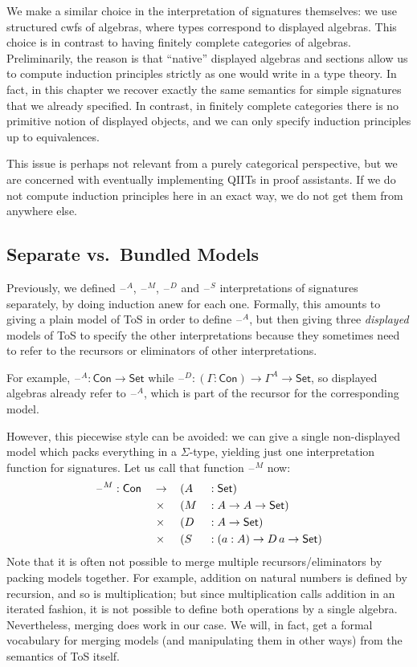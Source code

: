 \documentclass[12pt,a4paper,twoside,openany]{book}
\theoremstyle{remark}
\theoremstyle{definition}
\theoremstyle{theorem}
\newcommand{\Con}{\mathsf{Con}}
\newcommand{\blank}{\mathord{\hspace{1pt}\text{--}\hspace{1pt}}}
\newcommand{\Set}{\mathsf{Set}}
\begin{document}
We make a similar choice in the interpretation of signatures themselves: we use
structured cwfs of algebras, where types correspond to displayed algebras. This
choice is in contrast to having finitely complete categories of algebras.
Preliminarily, the reason is that ``native'' displayed algebras and sections
allow us to compute induction principles strictly as one would write in a type
theory. In fact, in this chapter we recover exactly the same semantics for
simple signatures that we already specified. In contrast, in finitely complete
categories there is no primitive notion of displayed objects, and we can only
specify induction principles up to equivalences.

This issue is perhaps not relevant from a purely categorical perspective, but we
are concerned with eventually implementing QIITs in proof assistants. If we do
not compute induction principles here in an exact way, we do not get them from
anywhere else.

\subsection{Separate vs.\ Bundled Models}

Previously, we defined $\blank^A$, $\blank^M$, $\blank^D$ and $\blank^S$
interpretations of signatures separately, by doing induction anew for each
one. Formally, this amounts to giving a plain model of ToS in order to define
$\blank^A$, but then giving three \emph{displayed} models of ToS to specify the
other interpretations because they sometimes need to refer to the recursors or
eliminators of other interpretations.

For example, $\blank^A : \Con \to \Set$ while $\blank^D : (\Gamma : \Con) \to
\Gamma^A \to \Set$, so displayed algebras already refer to $\blank^A$, which is
part of the recursor for the corresponding model.

However, this piecewise style can be avoided: we can give a single non-displayed
model which packs everything in a $\Sigma$-type, yielding just one
interpretation function for signatures. Let us call that function $\blank^M$ now:
\begin{alignat*}{5}
  & \blank^M : \Con &&\to \,&&(A &&: \Set)\\
  & &&\hspace{0.3em}\times &&(M  &&: A \to A \to \Set)\\
  & &&\hspace{0.3em}\times &&(D  &&: A \to \Set)\\
  & &&\hspace{0.3em}\times &&(S  &&: (a : A) \to D\,a \to \Set)
\end{alignat*}
Note that it is often not possible to merge multiple recursors/eliminators by
packing models together. For example, addition on natural numbers is defined by
recursion, and so is multiplication; but since multiplication calls addition in
an iterated fashion, it is not possible to define both operations by a single
algebra. Nevertheless, merging does work in our case. We will, in fact, get a
formal vocabulary for merging models (and manipulating them in other ways) from
the semantics of ToS itself.
\end{document}
